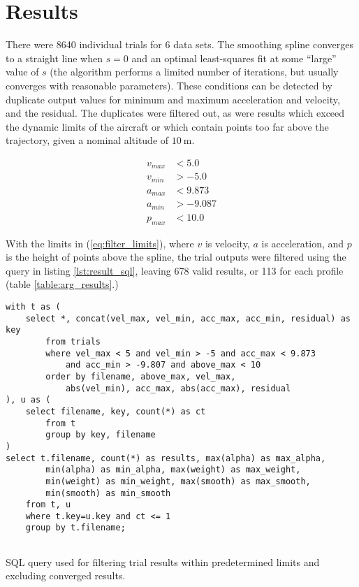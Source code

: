 \documentclass[doc]{apa6}
\begin{document}
\section{Results}


There were 8640 individual trials for 6 data sets. The smoothing spline converges to a straight line when $s=0$ and an optimal  least-squares fit at some ``large'' value of $s$ (the algorithm performs a limited number of iterations, but usually converges with reasonable parameters). These conditions can be detected by duplicate output values for minimum and maximum acceleration and velocity, and the residual. The duplicates were filtered out, as were results which exceed the dynamic limits of the aircraft or which contain points too far above the trajectory, given a nominal altitude of $\SI{10}\m$. 

\begin{equation} \label{eq:filter_limits}
\begin{split}
v_{max} &< 5.0 \\
v_{min} &> -5.0 \\
a_{max} &< 9.873 \\
a_{min} &> -9.087 \\
p_{max} &< 10.0
\end{split}
\end{equation}

With the limits in (\ref{eq:filter_limits}), where $v$ is velocity, $a$ is acceleration, and $p$ is the height of points above the spline, the trial outputs were filtered using the query in listing \ref{lst:result_sql}, leaving 678 valid results, or 113 for each profile (table \ref{table:arg_results}.)

\begin{listing}
\begin{verbatim}
with t as (
	select *, concat(vel_max, vel_min, acc_max, acc_min, residual) as key 
		from trials 
		where vel_max < 5 and vel_min > -5 and acc_max < 9.873 
			and acc_min > -9.807 and above_max < 10 
		order by filename, above_max, vel_max, 
			abs(vel_min), acc_max, abs(acc_max), residual
), u as (
	select filename, key, count(*) as ct 
		from t 
		group by key, filename
)
select t.filename, count(*) as results, max(alpha) as max_alpha, 
		min(alpha) as min_alpha, max(weight) as max_weight, 
		min(weight) as min_weight, max(smooth) as max_smooth, 
		min(smooth) as min_smooth 
	from t, u 
	where t.key=u.key and ct <= 1 
	group by t.filename;


\end{verbatim}
\caption{SQL query used for filtering trial results within predetermined limits and excluding converged results.}
\label{lst:result_sql}
\end{listing}
\end{document}
